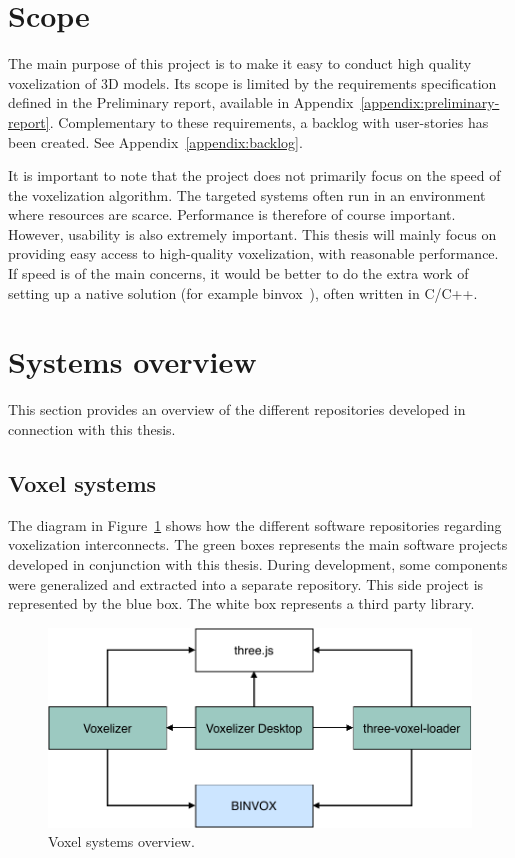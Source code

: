 \section{Scope}
The main purpose of this project is to make it easy to conduct high quality voxelization of 3D models. Its scope is limited by the requirements specification defined in the Preliminary report, available in Appendix~\ref{appendix:preliminary-report}. Complementary to these requirements, a backlog with user-stories has been created. See Appendix~\ref{appendix:backlog}.

It is important to note that the project does not primarily focus on the speed of the voxelization algorithm. The targeted systems often run in an environment where resources are scarce. Performance is therefore of course important. However, usability is also extremely important. This thesis will mainly focus on providing easy access to high-quality voxelization, with reasonable performance. If speed is of the main concerns, it would be better to do the extra work of setting up a native solution (for example binvox~\cite{binvox}), often written in C/C++.

\section{Systems overview}
This section provides an overview of the different repositories developed in connection with this thesis.
\subsection{Voxel systems}
The diagram in Figure~\ref{fig:voxel-systems-overview} shows how the different software repositories regarding voxelization interconnects. The green boxes represents the main software projects developed in conjunction with this thesis. During development, some components were generalized and extracted into a separate repository. This side project is represented by the blue box. The white box represents a third party library.
\begin{figure}[ht]
    \centering
    \includegraphics[page=1,scale=0.85]{sections/introduction/figures/voxel-systems-overview.pdf}
    \caption{Voxel systems overview.}
    \label{fig:voxel-systems-overview}
\end{figure}

